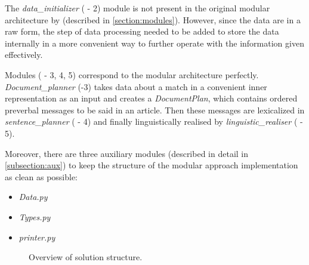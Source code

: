 The \emph{data\_initializer} ( - 2) module is not present in the original modular architecture by \cite{reiter1997building} (described in \ref{section:modules}). However, since the data are in a raw form, the step of data processing needed to be added to store the data internally in a more convenient way to further operate with the information given effectively.

Modules ( - 3, 4, 5) correspond to the modular architecture perfectly. \emph{Document\_planner} (-3) takes data about a match in a convenient inner representation as an input and creates a \emph{DocumentPlan}, which contains ordered preverbal messages to be said in an article. Then these messages are lexicalized in \emph{sentence\_planner} ( - 4) and finally linguistically realised by \emph{linguistic\_realiser} ( - 5). 

Moreover, there are three auxiliary modules (described in detail in \ref{subsection:aux}) to keep the structure of the modular approach implementation as clean as possible:
\begin{itemize}
	\item \emph{Data.py}
	\item \emph{Types.py}
	\item \emph{printer.py}
\end{itemize}

\begin{figure}[H]
	\caption{Overview of solution structure.}
	\label{fig:structure}
\end{figure}

